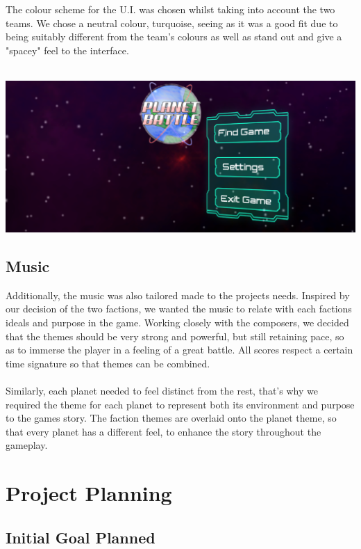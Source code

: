 \documentclass[11pt,a4paper]{article}
\begin{document}
\noindent
        The colour scheme for the U.I. was chosen whilst taking into account the two teams. We chose a neutral colour, turquoise, seeing as it was a good fit due to being suitably different from the team's colours as well as stand out and give a "spacey" feel to the interface. \\ \\
\begin{center}
\includegraphics[scale=0.2]{logos/ui.png}\\
\end{center}
        \subsection{Music}
    Additionally, the music was also tailored made to the projects needs. Inspired by our decision of the two factions, we wanted the music to relate with each factions ideals and purpose in the game. Working closely with the composers, we decided that the themes should be very strong and powerful, but still retaining pace, so as to immerse the player in a feeling of a great battle. All scores respect a certain time signature so that themes can be combined.\\ \\

\noindent
    Similarly, each planet needed to feel distinct from the rest, that's why we required the theme for each planet to represent both its environment and purpose to the games story. The faction themes are overlaid onto the planet theme, so that every planet has a different feel, to enhance the story throughout the gameplay.

\pagebreak

        \section{Project Planning}

        \subsection{Initial Goal Planned}
\end{document}
